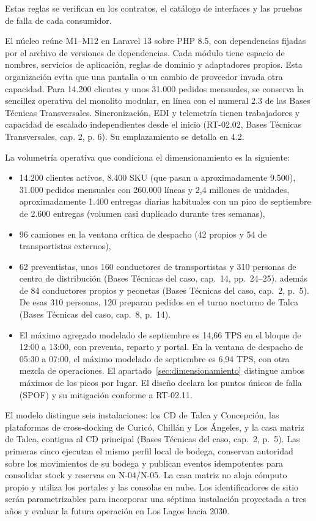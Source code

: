Estas reglas se verifican en los contratos, el catálogo de interfaces y las pruebas de falla de cada consumidor.

El núcleo reúne M1--M12 en Laravel 13 sobre PHP 8.5, con dependencias fijadas por el archivo de versiones de dependencias. Cada módulo tiene espacio de nombres, servicios de aplicación, reglas de dominio y adaptadores propios. Esta organización evita que una pantalla o un cambio de proveedor invada otra capacidad. Para 14.200 clientes y unos 31.000 pedidos mensuales, se conserva la sencillez operativa del monolito modular, en línea con el numeral 2.3 de las Bases Técnicas Transversales. Sincronización, EDI y telemetría tienen trabajadores y capacidad de escalado independientes desde el inicio (RT-02.02, Bases Técnicas Transversales, cap. 2, p. 6). Su emplazamiento se detalla en 4.2.

La volumetría operativa que condiciona el dimensionamiento es la siguiente:

\begin{itemize}
  \item 14.200 clientes activos, 8.400 SKU (que pasan a aproximadamente 9.500), 31.000 pedidos mensuales con 260.000 líneas y 2,4 millones de unidades, aproximadamente 1.400 entregas diarias habituales con un pico de septiembre de 2.600 entregas (volumen casi duplicado durante tres semanas),
  \item 96 camiones en la ventana crítica de despacho (42 propios y 54 de transportistas externos),
  \item 62 preventistas, unos 160 conductores de transportistas y 310 personas de centro de distribución (Bases Técnicas del caso, cap.~14, pp.~24--25), además de 84 conductores propios y peonetas (Bases Técnicas del caso, cap.~2, p.~5). De esas 310 personas, 120 preparan pedidos en el turno nocturno de Talca (Bases Técnicas del caso, cap.~8, p.~14).
  \item El máximo agregado modelado de septiembre es 14,66 TPS en el bloque de 12:00 a 13:00, con preventa, reparto y portal. En la ventana de despacho de 05:30 a 07:00, el máximo modelado de septiembre es 6,94 TPS, con otra mezcla de operaciones. El apartado~\ref{sec:dimensionamiento} distingue ambos máximos de los picos por lugar. El diseño declara los puntos únicos de falla (SPOF) y su mitigación conforme a RT-02.11.
\end{itemize}

El modelo distingue seis instalaciones: los CD de Talca y Concepción, las plataformas de cross-docking de Curicó, Chillán y Los Ángeles, y la casa matriz de Talca, contigua al CD principal (Bases Técnicas del caso, cap.~2, p.~5). Las primeras cinco ejecutan el mismo perfil local de bodega, conservan autoridad sobre los movimientos de su bodega y publican eventos idempotentes para consolidar stock y reservas en N-04/N-05. La casa matriz no aloja cómputo propio y utiliza los portales y las consolas en nube. Los identificadores de sitio serán parametrizables para incorporar una séptima instalación proyectada a tres años y evaluar la futura operación en Los Lagos hacia 2030.

\clearpage

